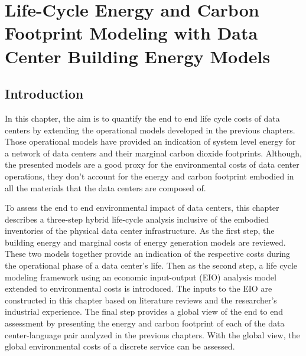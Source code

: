 \chapter{Life-Cycle Energy and Carbon Footprint Modeling with Data Center Building Energy Models}
\label{chp:intro}

\section{Introduction}
    In this chapter, the aim is to quantify the end to end life cycle costs of data centers by extending the operational models developed in the previous chapters. Those operational models have provided an indication of system level energy for a network of data centers and their marginal carbon dioxide footprints. Although, the presented models are a good proxy for the environmental costs of data center operations, they don't account for the energy and carbon footprint embodied in all the materials that the data centers are composed of.

    To assess the end to end environmental impact of data centers, this chapter describes a three-step hybrid life-cycle analysis inclusive of the embodied inventories of the physical data center infrastructure. As the first step, the building energy and marginal costs of energy generation models are reviewed. These two models together provide an indication of the respective costs during the operational phase of a data center's life. Then as the second step, a life cycle modeling framework using an economic input-output (EIO) analysis model extended to environmental costs is introduced. The inputs to the EIO are constructed in this chapter based on literature reviews and the researcher's industrial experience. The final step provides a global view of the end to end assessment by presenting the energy and carbon footprint of each of the data center-language pair analyzed in the previous chapters. With the global view, the global environmental costs of a discrete service can be assessed.

